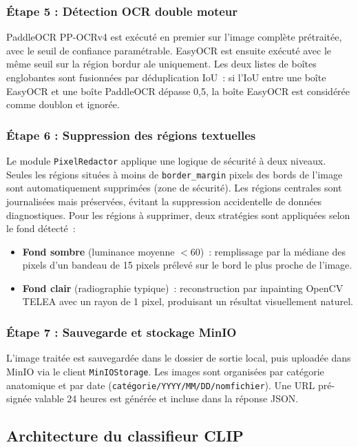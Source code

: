 \subsubsection{Étape 5 : Détection OCR double moteur}

PaddleOCR PP-OCRv4 est exécuté en premier sur l'image complète prétraitée, avec le seuil de confiance paramétrable. EasyOCR est ensuite exécuté avec le même seuil sur la région bordur ale uniquement. Les deux listes de boîtes englobantes sont fusionnées par déduplication IoU~: si l'IoU entre une boîte EasyOCR et une boîte PaddleOCR dépasse 0,5, la boîte EasyOCR est considérée comme doublon et ignorée.

\subsubsection{Étape 6 : Suppression des régions textuelles}

Le module \texttt{PixelRedactor} applique une logique de sécurité à deux niveaux. Seules les régions situées à moins de \texttt{border\_margin} pixels des bords de l'image sont automatiquement supprimées (zone de sécurité). Les régions centrales sont journalisées mais préservées, évitant la suppression accidentelle de données diagnostiques. Pour les régions à supprimer, deux stratégies sont appliquées selon le fond détecté~:
\begin{itemize}
  \item \textbf{Fond sombre} (luminance moyenne $< 60$)~: remplissage par la médiane des pixels d'un bandeau de 15 pixels prélevé sur le bord le plus proche de l'image.
  \item \textbf{Fond clair} (radiographie typique)~: reconstruction par inpainting OpenCV TELEA avec un rayon de 1 pixel, produisant un résultat visuellement naturel.
\end{itemize}

\subsubsection{Étape 7 : Sauvegarde et stockage MinIO}

L'image traitée est sauvegardée dans le dossier de sortie local, puis uploadée dans MinIO via le client \texttt{MinIOStorage}. Les images sont organisées par catégorie anatomique et par date (\texttt{catégorie/YYYY/MM/DD/nomfichier}). Une URL pré-signée valable 24 heures est générée et incluse dans la réponse JSON.

\subsection{Architecture du classifieur CLIP}

